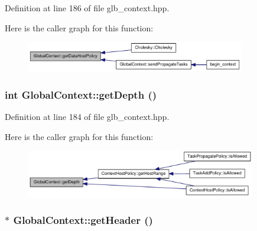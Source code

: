 Definition at line 186 of file glb\_\-context.hpp.

Here is the caller graph for this function:\nopagebreak
\begin{figure}[H]
\begin{center}
\leavevmode
\includegraphics[width=270pt]{class_global_context_a8770ae3435a92b44cdc1286e1668c9c8_icgraph}
\end{center}
\end{figure}
\hypertarget{class_global_context_a1142264190522f36cd19e2f3cd3d5d51}{
\subsubsection[{getDepth}]{\setlength{\rightskip}{0pt plus 5cm}int GlobalContext::getDepth ()}}
\label{class_global_context_a1142264190522f36cd19e2f3cd3d5d51}


Definition at line 184 of file glb\_\-context.hpp.

Here is the caller graph for this function:\nopagebreak
\begin{figure}[H]
\begin{center}
\leavevmode
\includegraphics[width=284pt]{class_global_context_a1142264190522f36cd19e2f3cd3d5d51_icgraph}
\end{center}
\end{figure}
\hypertarget{class_global_context_acede5d21ec0546c5a97ee5752960183a}{
\subsubsection[{getHeader}]{$\ast$ GlobalContext::getHeader ()}}
\label{class_global_context_acede5d21ec0546c5a97ee5752960183a}


